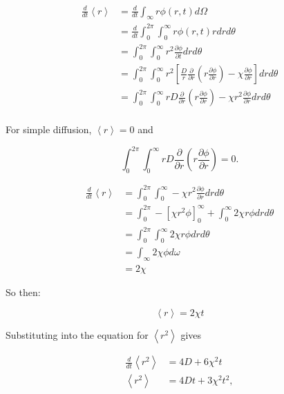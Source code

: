 \documentclass{article}
\newcommand{\D}[2]{\frac{\partial #1}{\partial #2}}
\begin{document}
\begin{equation}
\begin{split}
\frac{d}{dt} \left<r\right> &= \frac{d}{dt}\int_{\infty}r \phi(r,t) d\Omega \\
                              &= \frac{d}{dt} \int_0^{2\pi}\int_0^{\infty} r \phi(r,t)r dr d\theta \\
                              &= \int_0^{2\pi} \int_0^{\infty} r^2 \D{\phi}{t} dr d\theta \\
                              &= \int_0^{2\pi} \int_0^{\infty} r^2 \left[ \frac{D}{r} \D{}{r}\left(r \D{\phi}{r}\right)-\chi\D{\phi}{r} \right] dr d\theta \\
                              &= \int_0^{2\pi} \int_0^{\infty} rD  \D{}{r}\left(r \D{\phi}{r}\right) -  \chi r^2 \D{\phi}{r} dr d\theta \\
\nonumber
\end{split}
\end{equation}


For simple diffusion, $\left<r\right> = 0$ and


\begin{equation}
\int_0^{2\pi} \int_0^{\infty} rD  \D{}{r}\left(r \D{\phi}{r}\right) = 0 .
\end{equation}

\begin{equation}
\begin{split}
\frac{d}{dt} \left<r\right> &= \int_0^{2\pi} \int_0^{\infty} -  \chi r^2 \D{\phi}{r} dr d\theta \\
                            &= \int_0^{2\pi} - \left[ \chi r^2 \phi \right]_0^{\infty} + \int_0^{\infty} 2 \chi r \phi dr d\theta \\
                            &= \int_0^{2\pi} \int_0^{\infty} 2 \chi r \phi dr d\theta \\
                            &= \int_{\infty} 2 \chi \phi d\omega \\
                            &= 2\chi
\nonumber
\end{split}
\end{equation}

So then:

\begin{equation}
\left<r\right> = 2\chi t
\nonumber
\end{equation}

Substituting into the equation for $\left<r^2\right>$ gives

\begin{equation}
\begin{split}
\frac{d}{dt} \left<r^2\right> &= 4D + 6\chi^2t \\
\left<r^2\right>              &= 4Dt + 3\chi^2t^2 ,
\nonumber
\end{split}
\end{equation}
%
\end{document}
